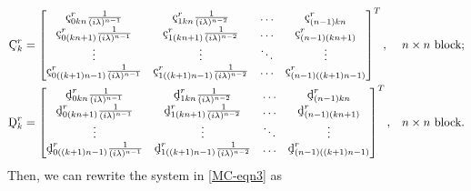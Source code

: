 \documentclass[10pt,reqno,oneside,a4paper]{article}
\begin{document}
\begin{align*}
\textup{\c{C}}^r_k &= 
\begin{bmatrix} 
\textup{\c{c}}_{0 kn}^r  \frac{1}{(i \lambda)^{n-1}} & \textup{\c{c}}_{1 kn}^r  \frac{1}{(i \lambda)^{n-2}} & \ldots & \textup{\c{c}}_{(n-1) kn}^r   \\
\textup{\c{c}}_{0 (kn+1)}^r  \frac{1}{(i \lambda)^{n-1}} & \textup{\c{c}}_{1 (kn+1)}^r  \frac{1}{(i \lambda)^{n-2}} & \ldots & \textup{\c{c}}_{(n-1) (kn+1)}^r   \\
\vdots & \vdots & \ddots & \vdots \\
\textup{\c{c}}_{0 ((k+1)n-1)}^r  \frac{1}{(i \lambda)^{n-1}} & \textup{\c{c}}_{1 ((k+1)n-1)}^r  \frac{1}{(i \lambda)^{n-2}} & \ldots & \textup{\c{c}}_{(n-1) ((k+1)n-1)}^r 
\end{bmatrix}^T, & n\times n \mbox{ block}; \\
\textup{\c{D}}^r_k &=
\begin{bmatrix} 
\textup{\c{d}}_{0 kn}^r  \frac{1}{(i \lambda)^{n-1}} & \textup{\c{d}}_{1 kn}^r  \frac{1}{(i \lambda)^{n-2}} & \ldots & \textup{\c{d}}_{(n-1) kn}^r   \\
\textup{\c{d}}_{0 (kn+1)}^r  \frac{1}{(i \lambda)^{n-1}} & \textup{\c{d}}_{1 (kn+1)}^r  \frac{1}{(i \lambda)^{n-2}} & \ldots & \textup{\c{d}}_{(n-1) (kn+1)}^r   \\
\vdots & \vdots & \ddots & \vdots \\
\textup{\c{d}}_{0 ((k+1)n-1)}^r  \frac{1}{(i \lambda)^{n-1}} & \textup{\c{d}}_{1 ((k+1)n-1)}^r  \frac{1}{(i \lambda)^{n-2}} & \ldots & \textup{\c{d}}_{(n-1) ((k+1)n-1)}^r 
\end{bmatrix}^T, & n\times n \mbox{ block}.
\end{align*}
Then, we can rewrite the system in \eqref{MC-eqn3} as 
\end{document}
